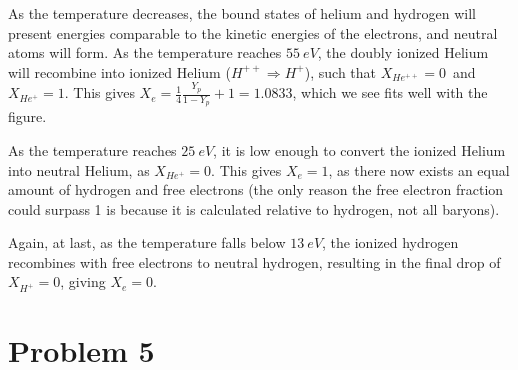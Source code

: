 \documentclass[10pt, a4paper]{article}
\begin{document}
As the temperature decreases, the bound states of helium and hydrogen will present energies comparable to the kinetic energies of the electrons, and neutral atoms will form. As the temperature reaches $\SI{55}{eV}$, the doubly ionized Helium will recombine into ionized Helium ($H^{++} \Rightarrow H^{+}$), such that $X_{He^{++}} = 0$ and $X_{He^{+}} = 1$. This gives $X_e = \frac{1}{4}\frac{Y_p}{1-Y_p} + 1 = 1.0833$, which we see fits well with the figure.

As the temperature reaches $\SI{25}{eV}$, it is low enough to convert the ionized Helium into neutral Helium, as $X_{He^{+}} = 0$. This gives $X_e = 1$, as there now exists an equal amount of hydrogen and free electrons (the only reason the free electron fraction could surpass 1 is because it is calculated relative to hydrogen, not all baryons).

Again, at last, as the temperature falls below $\SI{13}{eV}$, the ionized hydrogen recombines with free electrons to neutral hydrogen, resulting in the final drop of $X_{H^+} = 0$, giving $X_e = 0$.


\section{Problem 5}

\end{document}
